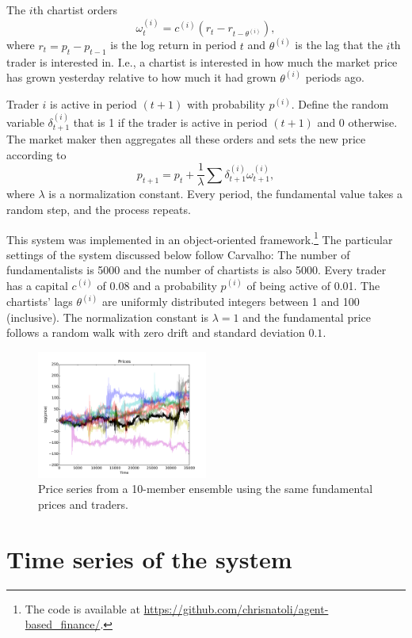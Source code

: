 \documentclass{article}
\newcommand\prn[1]{\left( #1 \right)}
\begin{document}
The $i$th chartist orders
$$
\omega_t^{(i)}=c^{(i)}\prn{r_t-r_{t-\theta^{(i)}}}
,$$
where $r_t=p_t-p_{t-1}$ is the log return in period $t$ and $\theta^{(i)}$ is the lag that the $i$th trader is interested in. I.e., a chartist is interested in how much the market price has grown yesterday relative to how much it had grown $\theta^{(i)}$ periods ago.

Trader $i$ is active in period $(t+1)$ with probability $p^{(i)}$. Define the random variable $\delta^{(i)}_{t+1}$ that is 1 if the trader is active in period $(t+1)$ and 0 otherwise. The market maker then aggregates all these orders and sets the new price according to
$$
p_{t+1}=p_t+\frac{1}{\lambda}\sum\delta_{t+1}^{(i)}\omega_{t+1}^{(i)},
$$
where $\lambda$ is a normalization constant. Every period, the fundamental value takes a random step, and the process repeats.

This system was implemented in an object-oriented framework.\footnote{The code is available at \url{https://github.com/chrisnatoli/agent-based_finance/}.} The particular settings of the system discussed below follow Carvalho: The number of fundamentalists is 5000 and the number of chartists is also 5000. Every trader has a capital $c^{(i)}$ of 0.08 and a probability $p^{(i)}$ of being active of 0.01. The chartists' lags $\theta^{(i)}$ are uniformly distributed integers between 1 and 100 (inclusive). The normalization constant is $\lambda=1$ and the fundamental price follows a random walk with zero drift and standard deviation $0.1$.
\begin{figure}
  \centering
  \includegraphics[width=0.5\textwidth]{images/rainbow_ensemble.pdf}
  \caption{Price series from a 10-member ensemble using the same fundamental prices and traders.}
  \label{fig:rainbow}
  \vspace{-40pt}
\end{figure}

\section{Time series of the system}
\end{document}
